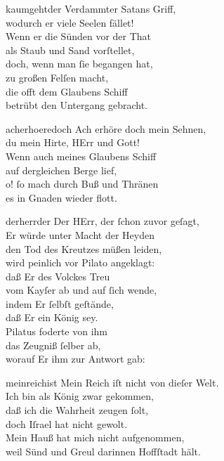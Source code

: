 \documentclass[tocstyle=ref-genre]{ees}
\begin{document}
{\begin{movement}{kaumgehtder}
  \clearpage
  Verdammter Satans Griff,\\
  wodurch er viele Seelen fället!\\
  Wenn er die Sünden vor der That\\
  als Staub und Sand vorſtellet,\\
  doch, wenn man ſie begangen hat,\\
  zu großen Felſen macht,\\
  die offt dem Glaubens Schiff\\
  betrübt den Untergang gebracht.
\end{movement}

\begin{movement}{acherhoeredoch}
  Ach erhöre doch mein Sehnen,\\
  du mein Hirte, HErr und Gott!\\
  Wenn auch meines Glaubens Schiff\\
  auf dergleichen Berge lief,\\
  o! ſo mach durch Buß und Thränen\\
  es in Gnaden wieder flott.
\end{movement}

\begin{movement}{derherrder}
  Der HErr, der ſchon zuvor geſagt,\\
  Er würde unter Macht der Heyden\\
  den Tod des Kreutzes müßen leiden,\\
  wird peinlich vor Pilato angeklagt:\\
  daß Er des Volckes Treu\\
  vom Kayſer ab und auf ſich wende,\\
  indem Er ſelbſt geſtände,\\
  daß Er ein König sey.\\
  Pilatus foderte von ihm\\
  das Zeugniß ſelber ab,\\
  worauf Er ihm zur Antwort gab:
\end{movement}

\begin{movement}{meinreichist}
  Mein Reich iſt nicht von dieſer Welt.\\
  Ich bin als König zwar gekommen,\\
  daß ich die Wahrheit zeugen ſolt,\\
  doch Iſrael hat nicht gewolt.\\
  Mein Hauß hat mich nicht aufgenommen,\\
  weil Sünd und Greul darinnen Hoffſtadt hält.
\end{movement}

}
\end{document}
